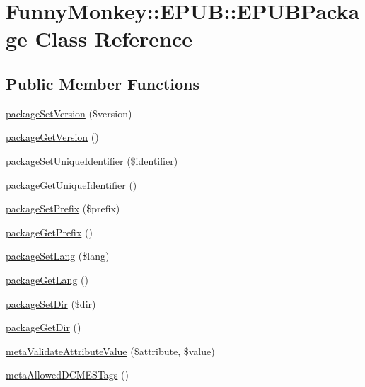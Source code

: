 \hypertarget{classFunnyMonkey_1_1EPUB_1_1EPUBPackage}{
\section{FunnyMonkey::EPUB::EPUBPackage Class Reference}
\label{classFunnyMonkey_1_1EPUB_1_1EPUBPackage}
}
\subsection*{Public Member Functions}
\begin{DoxyCompactItemize}
\item 
\hyperlink{classFunnyMonkey_1_1EPUB_1_1EPUBPackage_ac2b9775d0552e8f02877184450ae9478}{packageSetVersion} (\$version)
\item 
\hyperlink{classFunnyMonkey_1_1EPUB_1_1EPUBPackage_a44d9f3e36da6a85eaeeeb5968fc8a3f0}{packageGetVersion} ()
\item 
\hyperlink{classFunnyMonkey_1_1EPUB_1_1EPUBPackage_ae0072d72d513fca0624a59a9919b3a07}{packageSetUniqueIdentifier} (\$identifier)
\item 
\hyperlink{classFunnyMonkey_1_1EPUB_1_1EPUBPackage_a63146832a8575a5871e2e5aef394a461}{packageGetUniqueIdentifier} ()
\item 
\hyperlink{classFunnyMonkey_1_1EPUB_1_1EPUBPackage_a5634eeb73588fc937ad3447c638d8f43}{packageSetPrefix} (\$prefix)
\item 
\hyperlink{classFunnyMonkey_1_1EPUB_1_1EPUBPackage_a80c2aa6b2112748b190e7b5717896f40}{packageGetPrefix} ()
\item 
\hyperlink{classFunnyMonkey_1_1EPUB_1_1EPUBPackage_a933f6305f4ac303da179022c1c5af010}{packageSetLang} (\$lang)
\item 
\hyperlink{classFunnyMonkey_1_1EPUB_1_1EPUBPackage_a83fb0b1c4b14b0921c59277c4c970615}{packageGetLang} ()
\item 
\hyperlink{classFunnyMonkey_1_1EPUB_1_1EPUBPackage_a9015dae5ad5b19d07bb6784c01b09831}{packageSetDir} (\$dir)
\item 
\hyperlink{classFunnyMonkey_1_1EPUB_1_1EPUBPackage_a8fd604ae97a0d551c023bd0d02e5f8a7}{packageGetDir} ()
\item 
\hyperlink{classFunnyMonkey_1_1EPUB_1_1EPUBPackage_a2815df2855fe5286d84be8f975025e30}{metaValidateAttributeValue} (\$attribute, \$value)
\item 
\hyperlink{classFunnyMonkey_1_1EPUB_1_1EPUBPackage_aab62e50876fe5d169811f5d8a45a77f7}{metaAllowedDCMESTags} ()
\item 

\end{DoxyCompactItemize}
